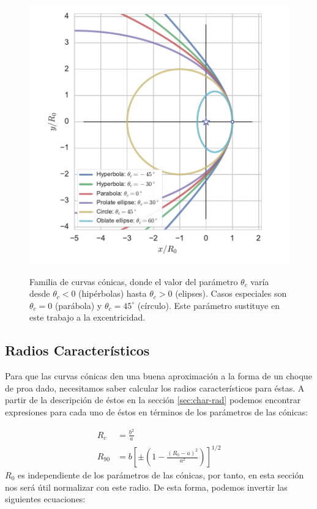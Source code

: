 \begin{figure}
  \includegraphics[width = \linewidth]{./Figures/conic1}
  \label{fig:conics-family}
  \caption{Familia de curvas cónicas, donde el valor del parámetro $\theta_c$ varía desde
    $\theta_c <0$ (hipérbolas) hasta $\theta_c > 0$ (elipses). Casos especiales son $\theta_c = 0$
  (parábola) y $\theta_c = 45^\circ$ (círculo). Este parámetro sustituye en este trabajo a la excentricidad.}
\end{figure}

\subsection{Radios Característicos}
\label{sec:conic-char-radii}
Para que las curvas cónicas den una buena aproximación a la forma de un choque de proa dado, necesitamos saber
calcular los radios característicos para éstas. A partir de la descripción de éstos en la sección
\ref{sec:char-rad} podemos encontrar expresiones para cada uno de éstos en términos de los parámetros de las
cónicas:

\begin{align}
  R_c &= \frac{b^2}{a} \label{eq:R-curv-conic}\\
  R_{90} &= b\left[\pm\left(1 - \frac{(R_0 - a)^2}{a^2}\right)\right]^{1/2} \label{eq:R90-conic}
\end{align}
$R_0$ es independiente de los parámetros de las cónicas, por tanto, en
esta sección nos será útil normalizar con este radio. De esta forma,
podemos invertir las siguientes ecuaciones:


